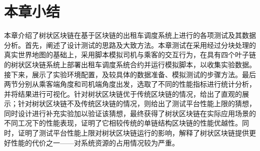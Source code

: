 \section{本章小结}

本章介绍了树状区块链在基于区块链的出租车调度系统上进行的各项测试及其数据分析。首先，阐述了设计测试的思路及大致方法。本章测试在采用经过分块处理的真实世界地图的基础上，采用脚本模拟司机与乘客的交互行为，在具有四个叶子链的树状区块链系统上部署出租车调度系统合约并运行模拟脚本，以收集实验数据。接下来，展示了实验环境配置，及较具体的数据准备、模拟测试的步骤方法。最后两节分别从乘客端角度和司机端角度出发，选取了不同的性能指标进行统计分析，并将结果进行可视化。针对树状区块链优于传统区块链的情况，给出了直观的展示；针对树状区块链不及传统区块链的情况，则给出了测试平台性能上限的猜想，同时设计进行补充实验加以验证该猜想，最终获得了树状区块链在实际应用场景的不同工况下的性能表现，证明了它相较传统的单链结构区块链的性能优越性。同时，证明了测试平台性能上限对树状区块链运行的影响，解释了树状区块链提供更好性能的代价之一——对系统资源的占用情况较为严重。
